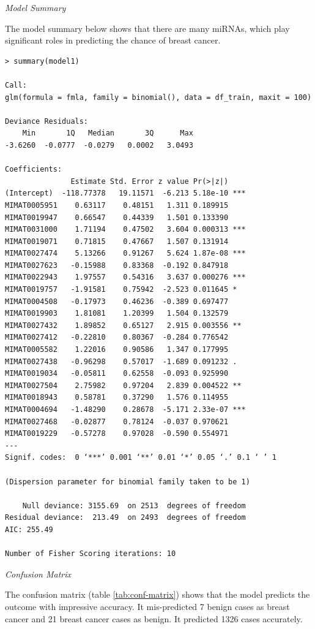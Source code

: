 \documentclass{bioinfo}
\begin{document}
{\it Model Summary}

The model summary below shows that there are many miRNAs, which play significant roles in predicting the chance of breast cancer. 



\begin{lstlisting}[label=LogisticModel, basicstyle=\tiny, caption=Model Summary, frame=htb]
> summary(model1)

Call:
glm(formula = fmla, family = binomial(), data = df_train, maxit = 100)

Deviance Residuals:
    Min       1Q   Median       3Q      Max
-3.6260  -0.0777  -0.0279   0.0002   3.0493

Coefficients:
               Estimate Std. Error z value Pr(>|z|)
(Intercept)  -118.77378   19.11571  -6.213 5.18e-10 ***
MIMAT0005951    0.63117    0.48151   1.311 0.189915
MIMAT0019947    0.66547    0.44339   1.501 0.133390
MIMAT0031000    1.71194    0.47502   3.604 0.000313 ***
MIMAT0019071    0.71815    0.47667   1.507 0.131914
MIMAT0027474    5.13266    0.91267   5.624 1.87e-08 ***
MIMAT0027623   -0.15988    0.83368  -0.192 0.847918
MIMAT0022943    1.97557    0.54316   3.637 0.000276 ***
MIMAT0019757   -1.91581    0.75942  -2.523 0.011645 *
MIMAT0004508   -0.17973    0.46236  -0.389 0.697477
MIMAT0019903    1.81081    1.20399   1.504 0.132579
MIMAT0027432    1.89852    0.65127   2.915 0.003556 **
MIMAT0027412   -0.22810    0.80367  -0.284 0.776542
MIMAT0005582    1.22016    0.90586   1.347 0.177995
MIMAT0027438   -0.96298    0.57017  -1.689 0.091232 .
MIMAT0019034   -0.05811    0.62558  -0.093 0.925990
MIMAT0027504    2.75982    0.97204   2.839 0.004522 **
MIMAT0018943    0.58781    0.37290   1.576 0.114955
MIMAT0004694   -1.48290    0.28678  -5.171 2.33e-07 ***
MIMAT0027468   -0.02877    0.78124  -0.037 0.970621
MIMAT0019229   -0.57278    0.97028  -0.590 0.554971
---
Signif. codes:  0 ‘***’ 0.001 ‘**’ 0.01 ‘*’ 0.05 ‘.’ 0.1 ‘ ’ 1

(Dispersion parameter for binomial family taken to be 1)

    Null deviance: 3155.69  on 2513  degrees of freedom
Residual deviance:  213.49  on 2493  degrees of freedom
AIC: 255.49

Number of Fisher Scoring iterations: 10
\end{lstlisting}


{\it Confusion Matrix}

The confusion matrix (table \ref{tab:conf-matrix}) shows that the model predicts the outcome with impressive accuracy. It mis-predicted 7 benign cases as breast cancer and 21 breast cancer cases as benign. It predicted 1326 cases accurately.
\end{document}
